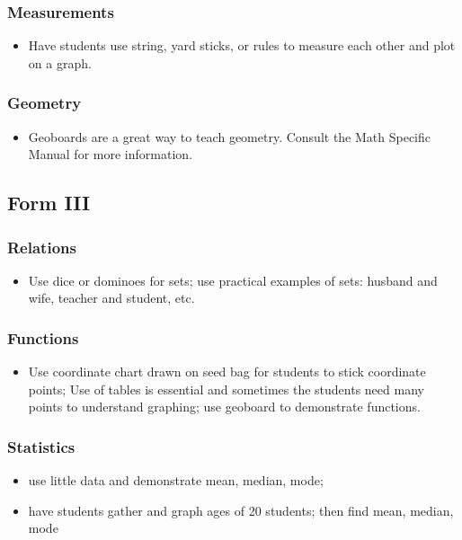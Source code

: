 \subsubsection{Measurements}
\begin{itemize}
\item Have students use string, yard sticks, or rules to measure each other and plot on a graph.
\end{itemize}

\subsubsection{Geometry}
\begin{itemize}
\item Geoboards are a great way to teach geometry.  Consult the Math Specific Manual for more information.
\end{itemize}

\subsection{Form III}
\subsubsection{Relations}
\begin{itemize}
\item	Use dice or dominoes for sets; use practical examples of sets: husband and wife, teacher and student, etc. 
\end{itemize}

\subsubsection{Functions}
\begin{itemize}
\item	Use coordinate chart drawn on seed bag for students to stick coordinate points; Use of tables is essential and sometimes the students need many points to understand graphing; use geoboard to demonstrate functions.
\end{itemize}

\subsubsection{Statistics}
\begin{itemize}
\item	use little data and demonstrate mean, median, mode;
\item	have students gather and graph ages of 20 students; then find mean, median, mode              
\end{itemize}

